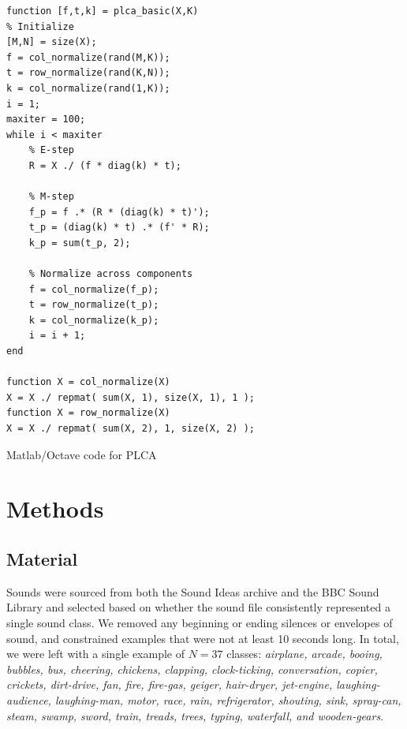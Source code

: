 \documentclass[a4paper,11pt,final]{ThesisStyle}
\begin{document}
\begin{program}
  \begin{verbatim}
function [f,t,k] = plca_basic(X,K)
% Initialize
[M,N] = size(X);
f = col_normalize(rand(M,K));
t = row_normalize(rand(K,N));
k = col_normalize(rand(1,K));
i = 1;
maxiter = 100;
while i < maxiter
    % E-step
    R = X ./ (f * diag(k) * t);
    
    % M-step
    f_p = f .* (R * (diag(k) * t)');
    t_p = (diag(k) * t) .* (f' * R);
    k_p = sum(t_p, 2);
    
    % Normalize across components
    f = col_normalize(f_p);
    t = row_normalize(t_p);
    k = col_normalize(k_p);
    i = i + 1;
end

function X = col_normalize(X)
X = X ./ repmat( sum(X, 1), size(X, 1), 1 );
function X = row_normalize(X)
X = X ./ repmat( sum(X, 2), 1, size(X, 2) );
\end{verbatim}
  \caption{Matlab/Octave code for PLCA}
\end{program}




\section{Methods}

\subsection{Material}
Sounds were sourced from both the Sound Ideas archive and the BBC Sound Library and selected based on whether the sound file consistently represented a single sound class.  We removed any beginning or ending silences or envelopes of sound, and constrained examples that were not at least 10 seconds long.  In total, we were left with a single example of $N = 37$ classes: \textit{airplane, arcade, booing, bubbles, bus, cheering, chickens, clapping, clock-ticking, conversation, copier, crickets, dirt-drive, fan, fire, fire-gas, geiger, hair-dryer, jet-engine, laughing-audience, laughing-man, motor, race, rain, refrigerator, shouting, sink, spray-can, steam, swamp, sword, train, treads, trees, typing, waterfall, and wooden-gears}.  
\end{document}
